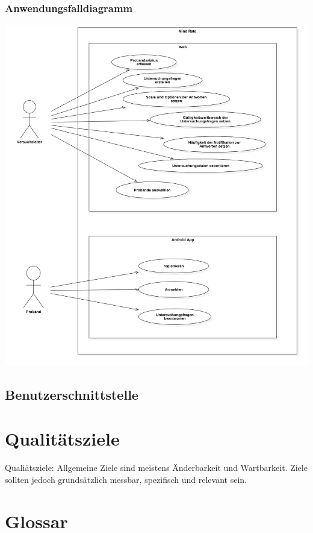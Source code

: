 \documentclass[a4paper]{scrreprt}
\begin{document}
            \subsection{Anwendungsfalldiagramm} 
                \vspace{0.4cm}
                \begin{center}
                    \includegraphics[scale = 0.4]{UseCaseDiagram1.jpg}
                \end{center}

        \newpage
        \section{Benutzerschnittstelle}
 
    \chapter{Qualitätsziele}
        Qualiätsziele: Allgemeine Ziele sind meistens Änderbarkeit und Wartbarkeit.
        Ziele sollten jedoch grundsätzlich messbar, spezifisch und relevant sein.
 
    \chapter{Glossar}
 
    \listoffigures
 
\end{document}
